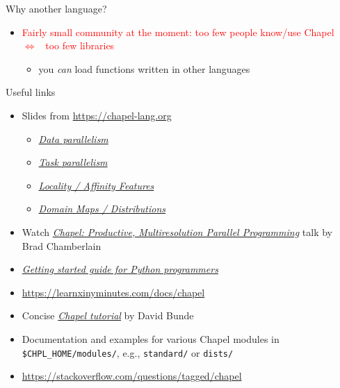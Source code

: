 \documentclass[10pt,xcolor=pdftex,dvipsnames,table]{beamer}
\newcommand{\tc}{\textcolor}
\begin{document}
\begin{frame}{Why another language? }
{\begin{itemize}
{\begin{itemize}
                \item Docker image \url{http://dockr.ly/2vJbi06} (simulates a multi-locale environment)
              \end{itemize}}
            \item \tc{red}{Fairly small community at the moment: too few people know/use Chapel\\
              \qquad$\Longleftrightarrow$~ too few libraries}
              {\let\small\scriptsize \small
                \begin{itemize}[]\setlength{\itemsep}{1.5mm}
                \item you {\it can} load functions written in other languages
                \end{itemize}}
    \end{itemize}}
\end{frame}

\begin{frame}{Useful links}
  \begin{itemize}\setlength{\itemsep}{3mm}
  \item Slides from \url{https://chapel-lang.org}
    \begin{itemize}\setlength{\itemsep}{0.5mm}
    \item \href{http://chapel.cray.com/tutorials/ACCU2017/03-DataPar.pdf}{\tc{Mahogany}{\it Data
      parallelism}}
    \item \href{https://chapel-lang.org/tutorials/ACCU2017/04-TaskPar.pdf}{\tc{Mahogany}{\it Task
        parallelism}}
    \item \href{https://chapel-lang.org/tutorials/ACCU2017/05-Locality.pdf}{\tc{Mahogany}{\it
        Locality / Affinity Features}}
    \item \href{https://chapel-lang.org/tutorials/ACCU2017/06-DomainMaps.pdf}{\tc{Mahogany}{\it
        Domain Maps / Distributions}}
    \end{itemize}
  \item Watch \href{https://youtu.be/0DjIdRJIqRY}{\tc{Mahogany}{\it Chapel: Productive, Multiresolution
      Parallel Programming}} talk by Brad Chamberlain
  \item \href{http://chapel-for-python-programmers.readthedocs.io/basics.html}{\tc{Mahogany}{\it
      Getting started guide for Python programmers}}
  \item \url{https://learnxinyminutes.com/docs/chapel}
  \item Concise \href{http://faculty.knox.edu/dbunde/teaching/chapel/tutorial-1.9.html}{\tc{Mahogany}{\it
      Chapel tutorial}} by David Bunde
  \item Documentation and examples for various Chapel modules in \texttt{\$CHPL\_HOME/modules/}, e.g.,
    \texttt{standard/} or \texttt{dists/}
  \item \url{https://stackoverflow.com/questions/tagged/chapel}
  \end{itemize}
\end{frame}
\end{document}
